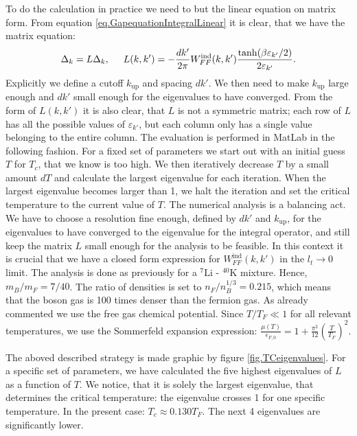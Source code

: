 To do the calculation in practice we need to but the linear equation on matrix form. From equation \eqref{eq.GapequationIntegralLinear} it is clear, that we have the matrix equation:
\begin{equation}
\Delta_k = L \Delta_k, \hspace{0.5cm} L(k,k') = -\frac{dk'}{2\pi} W^\text{ind}_{FF}(k,k')\frac{\tanh(\beta \varepsilon_{k'}/2)}{2\varepsilon_{k'}}. 
\label{eq.Gapmatrixequation}
\end{equation}
Explicitly we define a cutoff $k_{\text{up}}$ and spacing $dk'$. We then need to make $k_{\text{up}}$ large enough and $dk'$ small enough for the eigenvalues to have converged. From the form of $L(k,k')$ it is also clear, that $L$ is not a symmetric matrix; each row of $L$ has all the possible values of $\varepsilon_{k'}$, but each column only has a single value belonging to the entire column. The evaluation is performed in MatLab in the following fashion. For a fixed set of parameters we start out with an initial guess $T$ for $T_c$, that we know is too high. We then iteratively decrease $T$ by a small amount $dT$ and calculate the largest eigenvalue for each iteration. When the largest eigenvalue becomes larger than 1, we halt the iteration and set the critical temperature to the current value of $T$. The numerical analysis is a balancing act. We have to choose a resolution fine enough, defined by $dk'$ and $k_{\text{up}}$, for the eigenvalues to have converged to the eigenvalue for the integral operator, and still keep the matrix $L$ small enough for the analysis to be feasible. In this context it is crucial that we have a closed form expression for $W^\text{ind}_{FF}(k,k')$ in the $l_t \to 0$ limit. The analysis is done as previously for a $^{7}\text{Li}$ - $^{40}\text{K}$ mixture. Hence, $m_B/m_F = 7/40$. The ratio of densities is set to $n_F/{n_B^{1/3}} = 0.215$, which means that the boson gas is 100 times denser than the fermion gas. As already commented we use the free gas chemical potential. Since $T/T_F \ll 1$ for all relevant temperatures, we use the Sommerfeld expansion expression: $\frac{\mu(T)}{\epsilon_{F,0}} = 1 + \frac{\pi^2}{12}\left(\frac{T}{T_F}\right)^2$. 

The aboved described strategy is made graphic by figure \ref{fig.TCeigenvalues}. For a specific set of parameters, we have calculated the five highest eigenvalues of $L$ as a function of $T$. We notice, that it is solely the largest eigenvalue, that determines the critical temperature: the eigenvalue crosses 1 for one specific temperature. In the present case: $T_c \approx 0.130 T_F$. The next 4 eigenvalues are significantly lower. 

